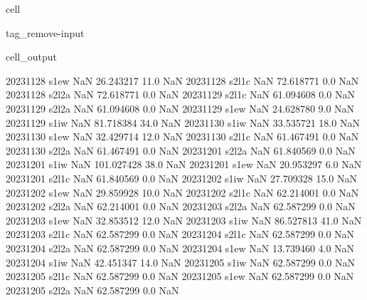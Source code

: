 \documentclass[letterpaper,10pt,english]{jupyterBook}
\begin{document}
\begin{sphinxuseclass}{cell}
\begin{sphinxuseclass}{tag_remove-input}
\begin{sphinxVerbatimOutput}
\begin{sphinxuseclass}{cell_output}
\begin{sphinxVerbatim}[commandchars=\\\{\}]
2023\PYGZhy{}11\PYGZhy{}28        s1\PYGZus{}ew           NaN   26.243217    11.0         NaN
2023\PYGZhy{}11\PYGZhy{}28       s2\PYGZus{}l1c           NaN   72.618771     0.0         NaN
2023\PYGZhy{}11\PYGZhy{}28       s2\PYGZus{}l2a           NaN   72.618771     0.0         NaN
2023\PYGZhy{}11\PYGZhy{}29       s2\PYGZus{}l1c           NaN   61.094608     0.0         NaN
2023\PYGZhy{}11\PYGZhy{}29       s2\PYGZus{}l2a           NaN   61.094608     0.0         NaN
2023\PYGZhy{}11\PYGZhy{}29        s1\PYGZus{}ew           NaN   24.628780     9.0         NaN
2023\PYGZhy{}11\PYGZhy{}29        s1\PYGZus{}iw           NaN   81.718384    34.0         NaN
2023\PYGZhy{}11\PYGZhy{}30        s1\PYGZus{}iw           NaN   33.535721    18.0         NaN
2023\PYGZhy{}11\PYGZhy{}30        s1\PYGZus{}ew           NaN   32.429714    12.0         NaN
2023\PYGZhy{}11\PYGZhy{}30       s2\PYGZus{}l1c           NaN   61.467491     0.0         NaN
2023\PYGZhy{}11\PYGZhy{}30       s2\PYGZus{}l2a           NaN   61.467491     0.0         NaN
2023\PYGZhy{}12\PYGZhy{}01       s2\PYGZus{}l2a           NaN   61.840569     0.0         NaN
2023\PYGZhy{}12\PYGZhy{}01        s1\PYGZus{}iw           NaN  101.027428    38.0         NaN
2023\PYGZhy{}12\PYGZhy{}01        s1\PYGZus{}ew           NaN   20.953297     6.0         NaN
2023\PYGZhy{}12\PYGZhy{}01       s2\PYGZus{}l1c           NaN   61.840569     0.0         NaN
2023\PYGZhy{}12\PYGZhy{}02        s1\PYGZus{}iw           NaN   27.709328    15.0         NaN
2023\PYGZhy{}12\PYGZhy{}02        s1\PYGZus{}ew           NaN   29.859928    10.0         NaN
2023\PYGZhy{}12\PYGZhy{}02       s2\PYGZus{}l1c           NaN   62.214001     0.0         NaN
2023\PYGZhy{}12\PYGZhy{}02       s2\PYGZus{}l2a           NaN   62.214001     0.0         NaN
2023\PYGZhy{}12\PYGZhy{}03       s2\PYGZus{}l2a           NaN   62.587299     0.0         NaN
2023\PYGZhy{}12\PYGZhy{}03        s1\PYGZus{}ew           NaN   32.853512    12.0         NaN
2023\PYGZhy{}12\PYGZhy{}03        s1\PYGZus{}iw           NaN   86.527813    41.0         NaN
2023\PYGZhy{}12\PYGZhy{}03       s2\PYGZus{}l1c           NaN   62.587299     0.0         NaN
2023\PYGZhy{}12\PYGZhy{}04       s2\PYGZus{}l1c           NaN   62.587299     0.0         NaN
2023\PYGZhy{}12\PYGZhy{}04       s2\PYGZus{}l2a           NaN   62.587299     0.0         NaN
2023\PYGZhy{}12\PYGZhy{}04        s1\PYGZus{}ew           NaN   13.739460     4.0         NaN
2023\PYGZhy{}12\PYGZhy{}04        s1\PYGZus{}iw           NaN   42.451347    14.0         NaN
2023\PYGZhy{}12\PYGZhy{}05        s1\PYGZus{}iw           NaN   62.587299     0.0         NaN
2023\PYGZhy{}12\PYGZhy{}05       s2\PYGZus{}l1c           NaN   62.587299     0.0         NaN
2023\PYGZhy{}12\PYGZhy{}05        s1\PYGZus{}ew           NaN   62.587299     0.0         NaN
2023\PYGZhy{}12\PYGZhy{}05       s2\PYGZus{}l2a           NaN   62.587299     0.0         NaN
\end{sphinxVerbatim}


\end{sphinxuseclass}
\end{sphinxVerbatimOutput}
\end{sphinxuseclass}
\end{sphinxuseclass}
\end{document}
